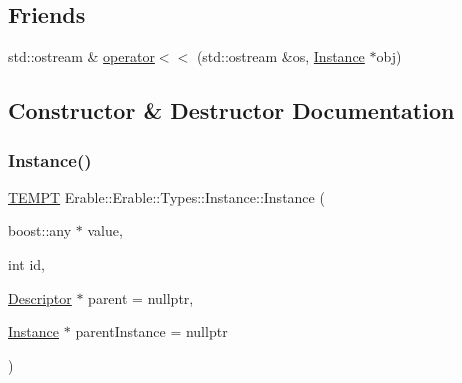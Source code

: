 \subsection*{Friends}
\begin{DoxyCompactItemize}
\item 
std\+::ostream \& \mbox{\hyperlink{class_erable_1_1_erable_1_1_types_1_1_instance_ae9b0965c49bbbabb9d3642948541bc39}{operator$<$$<$}} (std\+::ostream \&os, \mbox{\hyperlink{class_erable_1_1_erable_1_1_types_1_1_instance}{Instance}} $\ast$obj)
\end{DoxyCompactItemize}


\subsection{Constructor \& Destructor Documentation}
\mbox{\label{class_erable_1_1_erable_1_1_types_1_1_instance_a6e906dbe06e9f00a801dd55d185c1ffd}} 
\subsubsection{\texorpdfstring{Instance()}{Instance()}\hspace{0.1cm}{\footnotesize\ttfamily [1/2]}}
{\footnotesize\ttfamily \mbox{\hyperlink{_v_m_global_8hpp_af309683c0c7b45cf126c8742c4251511}{T\+E\+M\+PT}} Erable\+::\+Erable\+::\+Types\+::\+Instance\+::\+Instance (\begin{DoxyParamCaption}\item[{boost\+::any $\ast$}]{value,  }\item[{int}]{id,  }\item[{\mbox{\hyperlink{class_erable_1_1_descriptor}{Descriptor}} $\ast$}]{parent = {\ttfamily nullptr},  }\item[{\mbox{\hyperlink{class_erable_1_1_erable_1_1_types_1_1_instance}{Instance}} $\ast$}]{parent\+Instance = {\ttfamily nullptr} }\end{DoxyParamCaption})\hspace{0.3cm}{\ttfamily [inline]}}

\mbox{\label{class_erable_1_1_erable_1_1_types_1_1_instance_a81e1063d389f60f07e678907ccaa0239}} 
